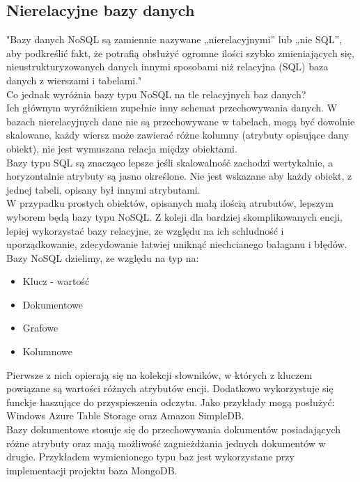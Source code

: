 \documentclass[12pt]{article}
\begin{document}
\begin{sloppypar}
{  \subsection{Nierelacyjne bazy danych}
  {
    "Bazy danych NoSQL są zamiennie nazywane „nierelacyjnymi” lub „nie SQL”, aby podkreślić fakt, że potrafią obsłużyć ogromne ilości szybko zmieniających się, 
    nieustrukturyzowanych danych innymi sposobami niż relacyjna (SQL) baza danych z wierszami i tabelami." \cite{mc-nosql}\\
    Co jednak wyróżnia bazy typu NoSQL na tle relacyjnych baz danych?\\
    Ich głównym wyróżnikiem zupełnie inny schemat przechowywania danych. W bazach nierelacyjnych dane nie są przechowywane w tabelach, mogą być dowolnie skalowane, 
    każdy wiersz może zawierać różne kolumny (atrybuty opisujące dany obiekt), nie jest wymuszana relacja między obiektami.\\
    Bazy typu SQL są znacząco lepsze jeśli skalowalność zachodzi wertykalnie, a horyzontalnie atrybuty są jasno określone. Nie jest wskazane aby każdy obiekt, z jednej 
    tabeli, opisany był innymi atrybutami.\\
    W przypadku prostych obiektów, opisanych małą ilością atrubutów, lepszym wyborem będą bazy typu NoSQL. Z koleji dla bardziej skomplikowanych encji, lepiej wykorzystać 
    bazy relacyjne, ze względu na ich schludność i uporządkowanie, zdecydowanie łatwiej uniknąć niechcianego bałaganu i błędów.\\
    Bazy NoSQL dzielimy, ze względu na typ na\cite{agh-nosql}:
    \begin{itemize}
      \item Klucz - wartość
      \item Dokumentowe
      \item Grafowe
      \item Kolumnowe
    \end{itemize}
    Pierwsze z nich opierają się na kolekcji słowników, w których z kluczem powiązane są wartości różnych atrybutów encji. Dodatkowo wykorzystuje się funckje haszujące 
    do przyspieszenia odczytu. Jako przykłady mogą posłużyć: Windows Azure Table Storage oraz Amazon SimpleDB.\\
    Bazy dokumentowe stosuje się do przechowywania dokumentów posiadających różne atrybuty oraz mają możliwość zagnieżdżania jednych dokumentów w drugie. Przykładem 
    wymienionego typu baz jest wykorzystane przy implementacji projektu baza MongoDB.\\
}}
\end{sloppypar}
\end{document}
